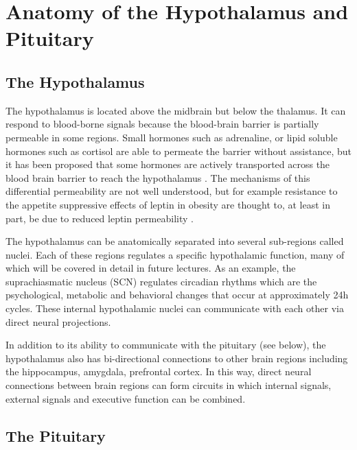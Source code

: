 \documentclass{tufte-handout}
\begin{document}
\pagebreak

\section{Anatomy of the Hypothalamus and Pituitary}

\subsection{The Hypothalamus}

The hypothalamus is located above the midbrain but below the thalamus.  It can respond to blood-borne signals because the blood-brain barrier is partially permeable in some regions.  Small hormones such as adrenaline, or lipid soluble hormones such as cortisol are able to permeate the barrier without assistance, but it has been proposed that some hormones are actively transported across the blood brain barrier to reach the hypothalamus \cite{Huber2001}.  The mechanisms of this differential permeability are not well understood, but for example resistance to the appetite suppressive effects of leptin in obesity are thought to, at least in part, be due to reduced leptin permeability \cite{Burguera2000}. 

  The hypothalamus can be anatomically separated into several sub-regions called nuclei.  Each of these regions regulates a specific hypothalamic function, many of which will be covered in detail in future lectures.  As an example, the suprachiasmatic nucleus (SCN) regulates circadian rhythms which are the psychological, metabolic and behavioral changes that occur at approximately 24h cycles.  These internal hypothalamic nuclei can communicate with each other via direct neural projections.

  In addition to its ability to communicate with the pituitary (see below), the hypothalamus also has bi-directional connections to other brain regions including the hippocampus, amygdala, prefrontal cortex.  In this way, direct neural connections between brain regions can form circuits in which internal signals, external signals and executive function can be combined.

\subsection{The Pituitary}
\end{document}
